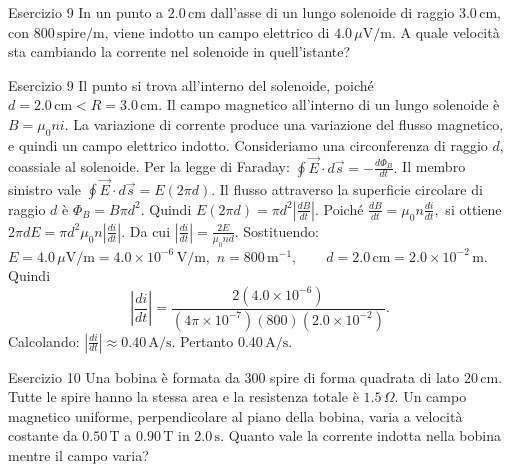 \documentclass[a4paper]{article}
\begin{document}
\begin{snippetexercise}{Esercizio 9}
    In un punto a \(2.0\,\mathrm{cm}\) dall'asse di un lungo solenoide di
    raggio \(3.0\,\mathrm{cm}\), con \(800\,\mathrm{spire/m}\), viene indotto
    un campo elettrico di \(4.0\,\mu\mathrm{V/m}\). A quale velocità sta
    cambiando la corrente nel solenoide in quell'istante?

\end{snippetexercise}
\begin{snippetsolution}{Esercizio 9}
    Il punto si trova all'interno del solenoide, poiché
    \(d = 2.0\,\mathrm{cm} < R = 3.0\,\mathrm{cm}.\)
    Il campo magnetico all'interno di un lungo solenoide è
    \(B = \mu_0 n i.\)
    La variazione di corrente produce una variazione del flusso magnetico, e
    quindi un campo elettrico indotto. Consideriamo una circonferenza di raggio
    \(d\), coassiale al solenoide.
    Per la legge di Faraday:
    \(\oint \vec{E}\cdot d\vec{s} = -\frac{d\Phi_B}{dt}.\)
    Il membro sinistro vale
    \(\oint \vec{E}\cdot d\vec{s} = E(2\pi d).\)
    Il flusso attraverso la superficie circolare di raggio \(d\) è
    \(\Phi_B = B\pi d^2.\)
    Quindi
    \(E(2\pi d) = \pi d^2 \left|\frac{dB}{dt}\right|.\)
    Poiché
    \(\frac{dB}{dt} = \mu_0 n\frac{di}{dt},\)
    si ottiene
    \(2\pi d E = \pi d^2 \mu_0 n \left|\frac{di}{dt}\right|.\)
    Da cui
    \(\left|\frac{di}{dt}\right| = \frac{2E}{\mu_0 n d}.\)
    Sostituendo:
    \(E = 4.0\,\mu\mathrm{V/m} = 4.0 \times 10^{-6}\,\mathrm{V/m},\)
    \(n = 800\,\mathrm{m^{-1}}, \qquad d = 2.0\,\mathrm{cm} = 2.0 \times 10^{-2}\,\mathrm{m}.\)
    Quindi
    \[
        \left|\frac{di}{dt}\right|
        =
        \frac{
            2(4.0 \times 10^{-6})
        }{
            \left(4\pi \times 10^{-7}\right)
            (800)
            \left(2.0 \times 10^{-2}\right)
        }.
    \]
    Calcolando:
    \(\left|\frac{di}{dt}\right| \approx 0.40\,\mathrm{A/s}.\)
    Pertanto
    \(\boxed{0.40\,\mathrm{A/s}}.\)
\end{snippetsolution}
\begin{snippetexercise}{Esercizio 10}
    Una bobina è formata da \(300\) spire di forma quadrata di lato
    \(20\,\mathrm{cm}\). Tutte le spire hanno la stessa area e la resistenza
    totale è \(1.5\,\Omega\). Un campo magnetico uniforme, perpendicolare al
    piano della bobina, varia a velocità costante da \(0.50\,\mathrm{T}\) a
    \(0.90\,\mathrm{T}\) in \(2.0\,\mathrm{s}\). Quanto vale la corrente
    indotta nella bobina mentre il campo varia?

\end{snippetexercise}
\end{document}
